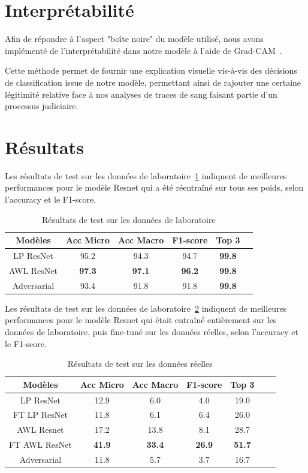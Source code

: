 \documentclass[a4paper]{article}
\begin{document}
\section{Interprétabilité}

Afin de répondre à l'aspect "boîte noire" du modèle utilisé, nous avons implémenté de l'interprétabilité dans notre modèle à l'aide de Grad-CAM~\cite{GRADCAM}. 

Cette méthode permet de fournir une explication visuelle vis-à-vis des décisions de classification issue de notre modèle, permettant ainsi de rajouter une certaine légitimité relative face à nos analyses de traces de sang faisant partie d'un processus judiciaire. 



\section{Résultats}

Les résultats de test sur les données de laboratoire~\ref{tab:results_lab} indiquent de meilleures performances pour le modèle Resnet qui a été réentraîné sur tous ses poids, selon l'accuracy et le F1-score. 

\begin{table}[ht]
  \centering
    \begin{tabular}{cccccc}
    \toprule
    Modèles & Acc Micro & Acc Macro & F1-score & Top 3 \\
    \midrule
    LP ResNet & 95.2 & 94.3 & 94.7 & \textbf{99.8} \\
    AWL ResNet & \textbf{97.3} & \textbf{97.1} & \textbf{96.2} & \textbf{99.8} \\
    Adversarial & 93.4 & 91.8 & 91.8 & \textbf{99.8} \\
    \bottomrule
    \end{tabular}
  \label{tab:results_lab}
  \caption{Résultats de test sur les données de laboratoire}
\end{table}

Les résultats de test sur les données de laboratoire~\ref{tab: results_real} indiquent de meilleures performances pour le modèle Resnet qui était entraîné entièrement sur les données de laboratoire, puis fine-tuné sur les données réelles, selon l'accuracy et le F1-score. 

\begin{table}[ht]
  \centering
    \begin{tabular}{ccccccc}
    \toprule
    Modèles & Acc Micro & Acc Macro & F1-score & Top 3 \\
    \midrule
    LP ResNet & 12.9 & 6.0 & 4.0 & 19.0 \\
    FT LP ResNet & 11.8 & 6.1 & 6.4 & 26.0 \\
    AWL Resnet & 17.2 & 13.8 & 8.1 & 28.7 \\
    FT AWL ResNet & \textbf{41.9} & \textbf{33.4} & \textbf{26.9} & \textbf{51.7} \\
    Adversarial & 11.8 & 5.7 & 3.7 & 16.7 \\
    \bottomrule
    \end{tabular}
  \label{tab: results_real}
   \caption{Résultats de test sur les données réelles}
\end{table}
\end{document}
